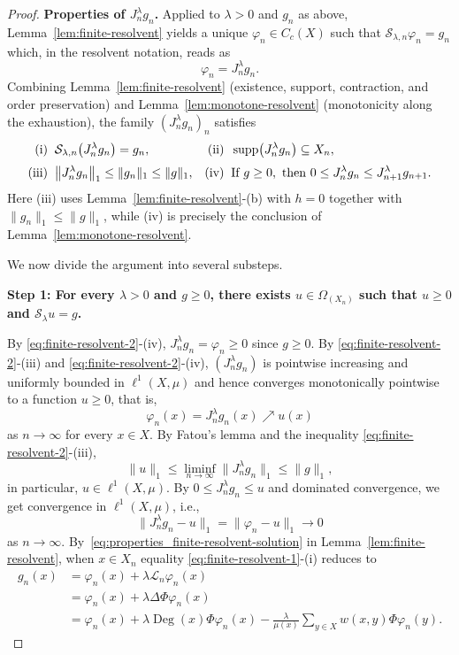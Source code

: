\documentclass[letterpaper]{article}
\theoremstyle{definition}
\theoremstyle{named}
\numberwithin{equation}{section}
\newcommand{\lm}{\lambda}
\newcommand{\Deg}{\operatorname{Deg}}
\newcommand{\Deltaphi}{\mathcal{L}}
\begin{document}
\begin{proof}
\medskip
\noindent\textbf{Properties of $J^\lambda_n g_n$.} Applied to $\lambda>0$ and $ g_n$
as above, 
Lemma~\ref{lem:finite-resolvent} yields a unique $\varphi_n\in C_c(X)$ such that $\mathcal{S}_{\lambda,n}\varphi_n=g_n$ which, in the resolvent notation, reads as
\[
\varphi_n = J^\lambda_n g_n.
\]
Combining Lemma~\ref{lem:finite-resolvent} (existence, support, contraction, and order preservation) and Lemma~\ref{lem:monotone-resolvent} (monotonicity along the exhaustion), the family $(J^\lambda_n g_n)_n$ satisfies
\begin{align}
\textup{(i)} \;\; & \mathcal{S}_{\lambda,n}\bigl(J^\lambda_n g_n\bigr) = g_n,
& \textup{(ii)} \;\; & \operatorname{supp}\bigl(J^\lambda_n g_n\bigr)\subseteq X_n, \label{eq:finite-resolvent-1}\\[2pt]
\textup{(iii)} \;\; & \bigl\|J^\lambda_n g_n\bigr\|_1 \le \|g_n\|_1 \le \|g\|_1,
& \textup{(iv)} \;\; & \mbox{If } g\geq 0, \mbox{ then } 0\leq J^\lambda_n g_n \le J^\lambda_{n+1} g_{n+1}. \label{eq:finite-resolvent-2}
\end{align}
Here (iii) uses Lemma~\ref{lem:finite-resolvent}-(b) with $h=0$ together with $\|g_n\|_1\le\|g\|_1$, while (iv) is precisely the conclusion of Lemma~\ref{lem:monotone-resolvent}.

We now divide  the argument into several substeps.

\medskip
\noindent\textbf{Step 1: For every $\lambda>0$ and $g\geq 0$, there exists $u\in \Omega_{(X_n)}$ such that $u \geq 0$ and $\mathcal{S}_\lambda u=g $.}

By \eqref{eq:finite-resolvent-2}-(iv), $J^\lm_n g_n = \varphi_n \geq 0$ since $g \geq 0$.
By \eqref{eq:finite-resolvent-2}-(iii) and \eqref{eq:finite-resolvent-2}-(iv), $(J^\lambda_n g_n)$ is pointwise 
increasing and uniformly bounded in $\ell^1(X,\mu)$ and
hence converges monotonically pointwise to a function $u \geq 0$, that is,
$$
 \varphi_n (x) = J^\lambda_n g_n (x)  \nearrow u(x)
$$
as $n \to \infty$ for every $x\in X$.
By Fatou's lemma 
and the  inequality  \eqref{eq:finite-resolvent-2}-(iii), 
$$
\|u\|_1 \leq  \liminf_{n \to \infty} \|J^\lambda_n g_n\|_1 \leq \|g\|_1,
$$
in particular, $u\in \ell^1(X,\mu)$. By $0\leq J^\lambda_n g_n \leq u$ 
and dominated convergence, we get convergence in $\ell^1(X,\mu)$, i.e., 
\begin{equation}\label{eq:varphi_n-->u}
\|J^\lambda_n g_n - u\|_1 = \|\varphi_n - u \|_1 \to 0
\end{equation}
as $n \to \infty$.
By~\eqref{eq:properties_finite-resolvent-solution} in Lemma~\ref{lem:finite-resolvent}, when $x\in X_n$
equality \eqref{eq:finite-resolvent-1}-(i) reduces to
\begin{align*}
g_n(x) &= \varphi_n(x)+\lambda \Deltaphi_n \varphi_n (x)\\
&= \varphi_n(x)+\lambda \Delta\Phi \varphi_n(x)\\
&= \varphi_n(x)+\lambda\Deg(x)\Phi\varphi_n(x)  -\frac{\lambda}{\mu(x)}\sum_{y\in X}w(x,y)\Phi\varphi_n(y).
\end{align*}


\end{proof}
\end{document}
